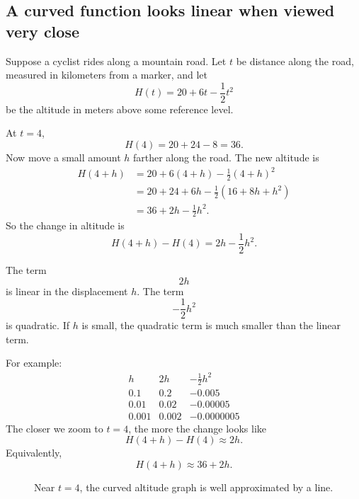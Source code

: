 \subsection{A curved function looks linear when viewed very close}

Suppose a cyclist rides along a mountain road.  Let \(t\) be distance along the road,
measured in kilometers from a marker, and let
\[
    H(t)=20+6t-\frac12 t^2
\]
be the altitude in meters above some reference level.

At \(t=4\),
\[
    H(4)=20+24-8=36.
\]
Now move a small amount \(h\) farther along the road.  The new altitude is
\[
\begin{aligned}
H(4+h)
&=
20+6(4+h)-\frac12(4+h)^2\\
&=
20+24+6h-\frac12(16+8h+h^2)\\
&=
36+2h-\frac12h^2.
\end{aligned}
\]
So the change in altitude is
\[
    H(4+h)-H(4)=2h-\frac12h^2.
\]

The term
\[
    2h
\]
is linear in the displacement \(h\).  The term
\[
    -\frac12h^2
\]
is quadratic.  If \(h\) is small, the quadratic term is much smaller than the linear
term.

For example:
\[
\begin{array}{c|c|c}
h & 2h & -\frac12h^2 \\ \hline
0.1 & 0.2 & -0.005\\
0.01 & 0.02 & -0.00005\\
0.001 & 0.002 & -0.0000005
\end{array}
\]
The closer we zoom to \(t=4\), the more the change looks like
\[
    H(4+h)-H(4)\approx 2h.
\]
Equivalently,
\[
    H(4+h)\approx 36+2h.
\]

\begin{figure}[h]
\centering
{}
\caption{Near \(t=4\), the curved altitude graph is well approximated by a line.}
\end{figure}

